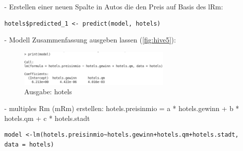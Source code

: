 \begin{itemize}
\item[-] Erstellen einer neuen Spalte in Autos die den Preis auf Basis des lRm:
\begin{lstlisting}
hotels$predicted_1 <- predict(model, hotels)
\end{lstlisting}

\item[-] Modell Zusammenfassung ausgeben lassen (\autoref{fig:hive5}):
\begin{figure}[!htb]
        \begin{minipage}{1\textwidth}
                \centering
                \includegraphics[width=0.70\textwidth]{pics/Hotels_model_1.png}\par\vspace{0cm}
                \caption{Ausgabe: hotels}
                \label{fig:hive5}
        \end{minipage}
\end{figure}


\item[-] multiples Rm (mRm) erstellen: hotels.preisinmio = a * hotels.gewinn + b * hotels.qm + c * hotels.stadt
\begin{lstlisting}
model <-lm(hotels.preisinmio~hotels.gewinn+hotels.qm+hotels.stadt, data = hotels)
\end{lstlisting}


\end{itemize}

